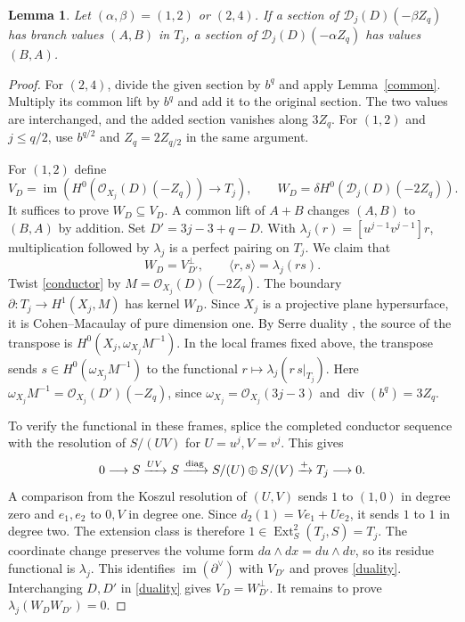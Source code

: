 \documentclass[11pt,a4paper,reqno]{amsart}
\numberwithin{equation}{section}
\theoremstyle{plain}
\newtheorem{lemma}[theorem]{Lemma}
\newcommand{\OO}{\mathcal O}
\newcommand{\Dcal}{\mathcal D}
\DeclareMathOperator{\im}{im}
\begin{document}
\begin{lemma}\label{interchange}
Let $(\alpha,\beta)=(1,2)$ or $(2,4)$. If a section of $\Dcal_j(D)(-\beta Z_q)$ has branch values $(A,B)$ in $T_j$, a section of $\Dcal_j(D)(-\alpha Z_q)$ has values $(B,A)$.
\end{lemma}
\begin{proof}
For $(2,4)$, divide the given section by $b^q$ and apply Lemma~\ref{common}. Multiply its common lift by $b^q$ and add it to the original section. The two values are interchanged, and the added section vanishes along $3Z_q$. For $(1,2)$ and $j\le q/2$, use $b^{q/2}$ and $Z_q=2Z_{q/2}$ in the same argument.

For $(1,2)$ define
\[
 V_D=\im\!\left(H^0(\OO_{X_j}(D)(-Z_q))\longrightarrow T_j\right),
 \qquad W_D=\delta H^0(\Dcal_j(D)(-2Z_q)).
\]
It suffices to prove $W_D\subseteq V_D$. A common lift of $A+B$ changes $(A,B)$ to $(B,A)$ by addition. Set $D'=3j-3+q-D$. With $\lambda_j(r)=[u^{j-1}v^{j-1}]r$, multiplication followed by $\lambda_j$ is a perfect pairing on $T_j$. We claim that
\begin{equation}\label{duality}
 W_D=V_{D'}^\perp,\qquad \langle r,s\rangle=\lambda_j(rs).
\end{equation}
Twist \eqref{conductor} by $M=\OO_{X_j}(D)(-2Z_q)$. The boundary $\partial:T_j\to H^1(X_j,M)$ has kernel $W_D$. Since $X_j$ is a projective plane hypersurface, it is Cohen--Macaulay of pure dimension one. By Serre duality \cite{StacksCurve}, the source of the transpose is $H^0(X_j,\omega_{X_j}M^{-1})$. In the local frames fixed above, the transpose sends $s\in H^0(\omega_{X_j}M^{-1})$ to the functional $r\mapsto\lambda_j(r\,s|_{T_j})$. Here $\omega_{X_j}M^{-1}=\OO_{X_j}(D')(-Z_q)$, since $\omega_{X_j}=\OO_{X_j}(3j-3)$ and $\operatorname{div}(b^q)=3Z_q$.

To verify the functional in these frames, splice the completed conductor sequence with the resolution of $S/(UV)$ for $U=u^j,V=v^j$. This gives
\[
 0\longrightarrow S\xrightarrow{UV} S\xrightarrow{\rm diag}
 S/(U)\oplus S/(V)\xrightarrow{+}T_j\longrightarrow0 .
\]
A comparison from the Koszul resolution of $(U,V)$ sends $1$ to $(1,0)$ in degree zero and $e_1,e_2$ to $0,V$ in degree one. Since $d_2(1)=Ve_1+Ue_2$, it sends $1$ to $1$ in degree two. The extension class is therefore $1\in\operatorname{Ext}^2_S(T_j,S)=T_j$. The coordinate change preserves the volume form $da\wedge dx=du\wedge dv$, so its residue functional is $\lambda_j$. This identifies $\im(\partial^\vee)$ with $V_{D'}$ and proves \eqref{duality}. Interchanging $D,D'$ in \eqref{duality} gives $V_D=W_{D'}^\perp$. It remains to prove $\lambda_j(W_DW_{D'})=0$.


\end{proof}
\end{document}
